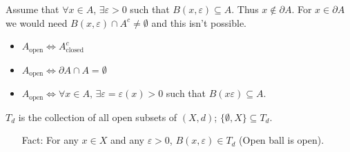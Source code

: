\documentclass[10pt]{article}
\begin{document}
Assume that $\forall x\in A$, $\exists \varepsilon>0$ such that $B(x,\varepsilon)\subseteq A$. Thus $x\notin\partial A$. For $x\in\partial A$ we would need $B(x,\varepsilon)\cap A^{c}\neq\emptyset$ and this isn't possible.
\begin{multicols}{3}
    \begin{itemize}
    \item $A_{\text{open}}\iff A^{c}_{\text{closed}}$
    \item $A_{\text{open}}\iff\partial A\cap A=\emptyset$
    \item $A_{\text{open}}\iff\forall x\in A,\,\exists\varepsilon=\varepsilon(x)>0$ such that $B(x\varepsilon)\subseteq A$.
\end{itemize}
\end{multicols}

$T_{d}$ is the collection of all open subsets of $(X,d)$; $\{\emptyset, X\}\subseteq T_{d}$. 
\begin{itemize}
    \item[Fact:] For any $x\in X$ and any $\varepsilon>0$, $B(x,\varepsilon)\in T_{d}$ (Open ball is open).
\end{itemize}
\end{document}
